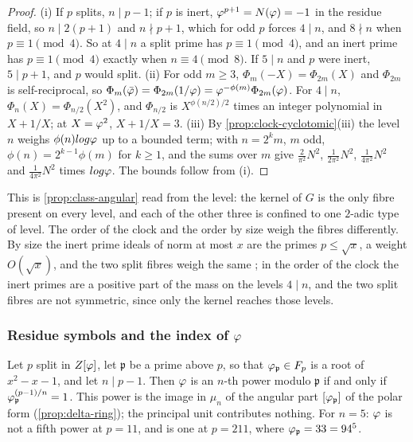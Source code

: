 \begin{proof}
(i) If $p$ splits, $n\mid p-1$; if $p$ is inert, $\varphi^{p+1}=N(\varphi)=-1$ in the residue field, so
$n\mid2(p+1)$ and $n\nmid p+1$, which for odd $p$ forces $4\mid n$, and $8\nmid n$ when
$p\equiv1\pmod4$.  So at $4\mid n$ a split prime has $p\equiv1\pmod4$, and an inert prime has
$p\equiv1\pmod4$ exactly when $n\equiv4\pmod8$.  If $5\mid n$ and $p$ were inert, $5\mid p+1$, and $p$
would split.
(ii) For odd $m\geq3$, $\Phi_m(-X)=\Phi_{2m}(X)$ and $\Phi_{2m}$ is self-reciprocal, so
$\Phi_m(\bar{\varphi})=\Phi_{2m}(1/\varphi)=\varphi^{-\phi(m)}\Phi_{2m}(\varphi)$.  For $4\mid n$,
$\Phi_n(X)=\Phi_{n/2}(X^2)$, and $\Phi_{n/2}$ is $X^{\phi(n/2)/2}$ times an integer polynomial in
$X+1/X$; at $X=\varphi^2$, $X+1/X=3$.
(iii) By \cref{prop:clock-cyclotomic}\textup{(iii)} the level $n$ weighs $\phi(n)log\varphi$ up to a
bounded term; with $n=2^km$, $m$ odd, $\phi(n)=2^{k-1}\phi(m)$ for $k\geq1$, and the sums over $m$ give
$\tfrac{2}{\pi^2}N^2$, $\tfrac1{2\pi^2}N^2$, $\tfrac1{4\pi^2}N^2$ and $\tfrac1{4\pi^2}N^2$ times
$log\varphi$.  The bounds follow from (i).
\end{proof}

This is \cref{prop:class-angular} read from the level: the kernel of $G$ is the only fibre present on
every level, and each of the other three is confined to one $2$-adic type of level.  The order of the
clock and the order by size weigh the fibres differently.  By size the inert prime ideals of norm at
most $x$ are the primes $p\leq\sqrt x$, a weight $O(\sqrt x)$, and the two split fibres weigh the same
; in the order of the clock the inert primes are a positive part of the mass on the levels
$4\mid n$, and the two split fibres are not symmetric, since only the kernel reaches those levels.

\subsubsection{Residue symbols and the index of $\varphi$}\label{ssec:phi-index}

\begin{proposition}\label{prop:phi-residue}
Let $p$ split in $Z[\varphi]$, let $\mathfrak p$ be a prime above $p$, so that $\varphi_{\mathfrak p}\in F_p$ is a root
of $x^2-x-1$, and let $n\mid p-1$.
Then $\varphi$ is an $n$-th power modulo $\mathfrak p$ if and only if $\varphi_{\mathfrak p}^{(p-1)/n}=1$.
This power is the image in $\mu_n$ of the angular part $[\varphi_{\mathfrak p}]$ of the polar form
(\cref{prop:delta-ring}); the principal unit contributes nothing.  For $n=5$: $\varphi$ is not a fifth
power at $p=11$, and is one at $p=211$, where $\varphi_{\mathfrak p}=33=94^5$.
\end{proposition}

